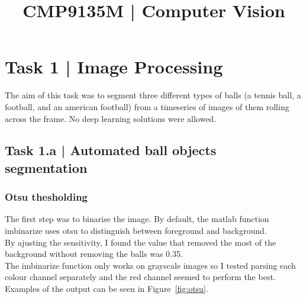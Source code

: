 \documentclass[conference]{IEEEtran}
\begin{document}
\title{CMP9135M | Computer Vision}

\author{
}

\maketitle

\section*{Task 1 | Image Processing}

    The aim of this task was to segment three different types of balls (a tennis ball, a football, and an american football) from a timeseries of
    images of them rolling across the frame. No deep learning solutions were allowed.

    \subsection*{Task 1.a | Automated ball objects segmentation}
        \subsubsection{Otsu thesholding}
        The first step was to binarise the image. By default, the matlab function imbinarize uses otsu to distinguish between foreground and 
        background. \\
        By ajusting the sensitivity, I found the value that removed the most of the background without removing the balls was 0.35.\\
        The imbinarize function only works on grayscale images so I tested parsing each colour channel separately and the red channel seemed to 
        perform the best. \\
        Examples of the output can be seen in Figure~\ref{fig:otsu}.
\end{document}
